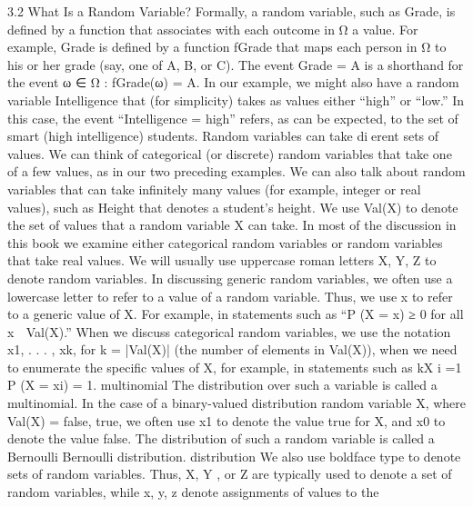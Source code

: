 3.2 What Is a Random Variable?
Formally, a random variable, such as Grade, is defined by a function that associates with each outcome in Ω a value. For example, Grade is defined by a function fGrade that maps each person in Ω to his or her grade (say, one of A, B, or C). The event Grade = A is a shorthand for the event {ω ∈ Ω : fGrade(ω) = A}. In our example, we might also have a random variable Intelligence that (for simplicity) takes as values either “high” or “low.” In this case, the event “Intelligence = high” refers, as can be expected, to the set of smart (high intelligence) students. Random variables can take dierent sets of values. We can think of categorical (or discrete) random variables that take one of a few values, as in our two preceding examples. We can also talk about random variables that can take infinitely many values (for example, integer or real values), such as Height that denotes a student’s height. We use Val(X) to denote the set of values that a random variable X can take. In most of the discussion in this book we examine either categorical random variables or random variables that take real values. We will usually use uppercase roman letters X, Y, Z to denote random variables. In discussing generic random variables, we often use a lowercase letter to refer to a value of a random variable. Thus, we use x to refer to a generic value of X. For example, in statements such as “P (X = x) ≥ 0 for all x ∈ Val(X).” When we discuss categorical random variables, we use the notation x1, . . . , xk, for k = |Val(X)| (the number of elements in Val(X)), when we need to enumerate the specific values of X, for example, in statements such as kX i =1 P (X = xi) = 1. multinomial The distribution over such a variable is called a multinomial. In the case of a binary-valued distribution random variable X, where Val(X) = {false, true}, we often use x1 to denote the value true for X, and x0 to denote the value false. The distribution of such a random variable is called a Bernoulli Bernoulli distribution. distribution We also use boldface type to denote sets of random variables. Thus, X, Y , or Z are typically used to denote a set of random variables, while x, y, z denote assignments of values to the


